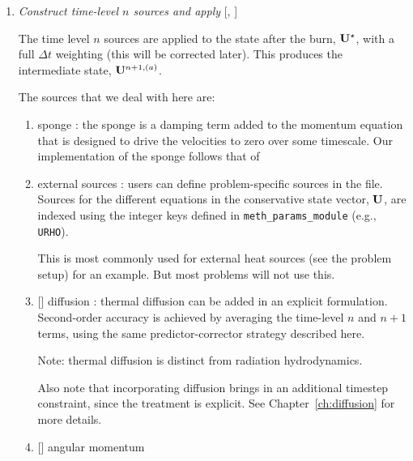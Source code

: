 \begin{enumerate}
  An experimental option (enabled via
  ) will create a custom
  distribution map based on the work needed in burning a zone and
  redistribute the boxes across processors before burning, to better
  load balance..  


\item \label{strang:oldsource} {\em Construct time-level $n$ sources and apply} 
  [, ]

  The time level $n$ sources are applied to the state after the burn,
  ${\bf U}^\star$, with a full $\Delta t$ weighting (this will be
  corrected later).  This produces the intermediate state,
  ${\bf U}^{n+1,(a)}$.

  The sources that we deal with here are:
  \begin{enumerate}
  \item sponge : the sponge is a damping term added to
    the momentum equation that is designed to drive the velocities to
    zero over some timescale.  Our implementation of the sponge
    follows that of \maestro~\cite{maestro:III}

  \item external sources : users can define problem-specific sources
    in the  file.  Sources for the different
    equations in the conservative state vector, ${\bf U}$, are indexed
    using the integer keys defined in {\tt meth\_params\_module}
    (e.g., {\tt URHO}).

    This is most commonly used for external heat sources (see the
     problem setup) for an example.  But most
    problems will not use this.

  \item {[]} diffusion : thermal diffusion can be
    added in an explicit formulation.  Second-order accuracy is
    achieved by averaging the time-level $n$ and $n+1$ terms, using
    the same predictor-corrector strategy described here.

    Note: thermal diffusion is distinct from radiation hydrodynamics.

    Also note that incorporating diffusion brings in an additional
    timestep constraint, since the treatment is explicit.  See
    Chapter~\ref{ch:diffusion} for more details. 

  \item {[]} angular momentum 


\end{enumerate}
\end{enumerate}
